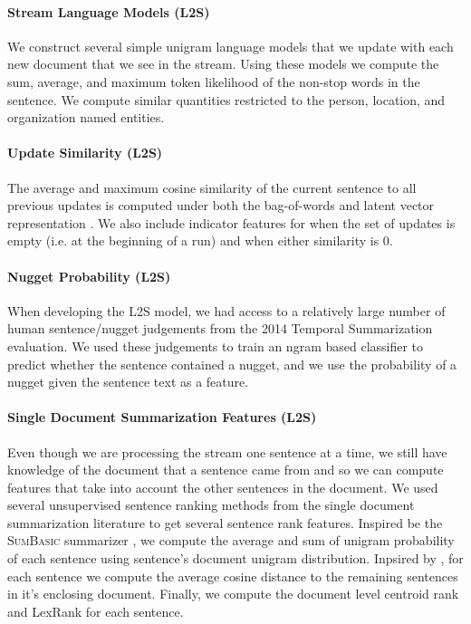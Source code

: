 \paragraph{Stream Language Models (L2S)}
We construct several simple unigram language models that we update with 
each new document that we see in the stream. Using these models 
we compute the sum, average, and maximum token likelihood
of the non-stop words
in the sentence. We compute similar quantities restricted to
the person, location, and organization named entities.

\paragraph{Update Similarity (L2S)} The average and maximum cosine similarity
of the current sentence to all previous updates is computed
under both the \tfidf{} bag-of-words and latent vector
representation \citep{guo2012simple}. 
We also include indicator features for when
the set of updates is empty (i.e. at the beginning of a run) and
when either similarity is 0.

\paragraph{Nugget Probability (L2S)}
When developing the L2S model, we had access to a relatively large number of
human sentence/nugget judgements from the 2014 Temporal Summarization 
evaluation.
We used
these judgements to train an ngram based classifier to predict whether
the sentence contained a nugget, and we use the probability of a nugget
given the sentence text as a feature. 


\paragraph{Single Document Summarization Features (L2S)}
Even though we are processing the stream one sentence at a time, we still
have knowledge of the document that a sentence came from and so we can
compute features that take into account the other sentences in the document.
We used several unsupervised sentence ranking methods from the single 
document summarization literature to get several sentence rank features.
Inspired be the \textsc{SumBasic} summarizer \citep{nenkova2005impact}, we
compute the average and sum of unigram probability of each sentence using 
sentence's document unigram distribution. Inpsired by \citep{guo2013updating},
for each sentence we compute the average cosine distance to the remaining 
sentences in it's enclosing document. Finally, we compute the document
level centroid rank \citep{radev2000centroid} and LexRank 
\citep{erkan2004lexrank} for each sentence.


